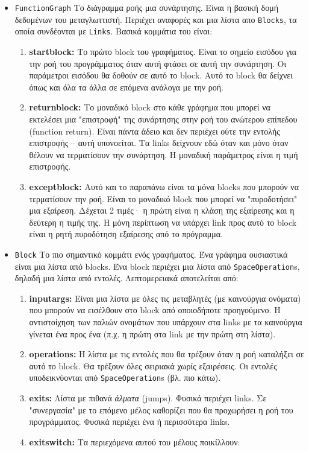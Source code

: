 \begin{itemize}

\item \texttt{FunctionGraph} Το διάγραμμα ροής μια συνάρτησης. Είναι η βασική
δομή δεδομένων του μεταγλωττιστή. Περιέχει αναφορές και μια λίστα απο
\texttt{Blocks}, τα οποία συνδέονται με \texttt{Links}. Βασικά κομμάτια του
είναι:

\begin{enumerate}
\item \textbf{startblock:} Το πρώτο block του γραφήματος. Είναι το σημείο
εισόδου για την ροή του προγράμματος όταν αυτή φτάσει σε αυτή την συνάρτηση. Οι
παράμετροι εισόδου θα δοθούν σε αυτό το block. Αυτό το block θα δείχνει όπως
και όλα τα άλλα σε επόμενα ανάλογα με την ροή.
\item \textbf{returnblock:} Το μοναδικό block στο κάθε γράφημα που μπορεί να
εκτελέσει μια "επιστροφή" της συνάρτησης στην ροή του ανώτερου επίπεδου
(function return). Είναι πάντα άδειο και δεν περιέχει ούτε την εντολής
επιστροφής – αυτή υπονοείται. Τα links δείχνουν εδώ όταν και μόνο όταν θέλουν
να τερματίσουν την συνάρτηση. Η μοναδική παράμετρος είναι η τιμή επιστροφής.
\item \textbf{exceptblock:} Αυτό και το παραπάνω είναι τα μόνα blocks που
μπορούν να τερματίσουν την ροή. Είναι το μοναδικό block που μπορεί να
"πυροδοτήσει" μια εξαίρεση. Δέχεται 2 τιμές· η πρώτη είναι η κλάση της εξαίρεσης
και η δεύτερη η τιμής της. Η μόνη περίπτωση να υπάρχει link προς αυτό το block
είναι η ρητή πυροδότηση εξαίρεσης από το πρόγραμμα.
\end{enumerate}

\item \texttt{Block} Το πιο σημαντικό κομμάτι ενός γραφήματος. Ένα γράφημα
ουσιαστικά είναι μια λίστα από blocks. Ένα block περιέχει μια λίστα από
\texttt{SpaceOperation}s, δηλαδή μια λίστα από εντολές. Λεπτομερειακά
αποτελείται από:

\begin{enumerate}
\item \textbf{inputargs:} Είναι μια λίστα με όλες τις μεταβλητές (με καινούργια
ονόματα) που μπορούν να εισέλθουν στο block από οποιοδήποτε προηγούμενο. Η
αντιστοίχηση των παλιών ονομάτων που υπάρχουν στα links με τα καινούργια 
γίνεται ένα προς ένα (π.χ. η πρώτη στα link με την πρώτη στη λίστα).
\item \textbf{operations:} Η λίστα με τις εντολές που θα τρέξουν όταν η ροή
καταλήξει σε αυτό το block. Θα τρέξουν όλες σειριακά χωρίς εξαιρέσεις. Οι
εντολές υποδεικνύονται από \texttt{SpaceOperation}s (βλ. πιο κάτω).
\item \textbf{exits:} Λίστα με πιθανά \textit{άλματα} (jumps). Φυσικά περιέχει
links. Σε "συνεργασία" με το επόμενο μέλος καθορίζει που θα προχωρήσει η ροή 
του προγράμματος. Φυσικά περιέχει ένα ή περισσότερα links.
\item \textbf{exitswitch:} Τα περιεχόμενα αυτού του μέλους ποικίλλουν:


\end{enumerate}
\end{itemize}
